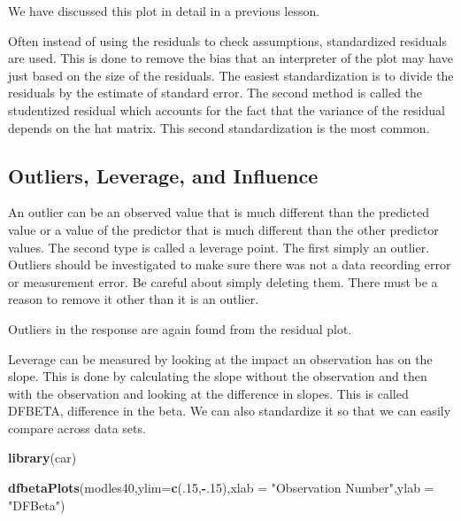 \documentclass[]{book}
\newenvironment{Shaded}{\begin{snugshade}}{\end{snugshade}}
\newcommand{\KeywordTok}[1]{\textcolor[rgb]{0.13,0.29,0.53}{\textbf{#1}}}
\newcommand{\DataTypeTok}[1]{\textcolor[rgb]{0.13,0.29,0.53}{#1}}
\newcommand{\DecValTok}[1]{\textcolor[rgb]{0.00,0.00,0.81}{#1}}
\newcommand{\StringTok}[1]{\textcolor[rgb]{0.31,0.60,0.02}{#1}}
\newcommand{\OperatorTok}[1]{\textcolor[rgb]{0.81,0.36,0.00}{\textbf{#1}}}
\newcommand{\NormalTok}[1]{#1}
\theoremstyle{definition}
\theoremstyle{definition}
\theoremstyle{definition}
\theoremstyle{remark}
\begin{document}
We have discussed this plot in detail in a previous lesson.

Often instead of using the residuals to check assumptions, standardized
residuals are used. This is done to remove the bias that an interpreter
of the plot may have just based on the size of the residuals. The
easiest standardization is to divide the residuals by the estimate of
standard error. The second method is called the studentized residual
which accounts for the fact that the variance of the residual depends on
the hat matrix. This second standardization is the most common.

\subsection{Outliers, Leverage, and
Influence}\label{outliers-leverage-and-influence}

An outlier can be an observed value that is much different than the
predicted value or a value of the predictor that is much different than
the other predictor values. The second type is called a leverage point.
The first simply an outlier. Outliers should be investigated to make
sure there was not a data recording error or measurement error. Be
careful about simply deleting them. There must be a reason to remove it
other than it is an outlier.

Outliers in the response are again found from the residual plot.

Leverage can be measured by looking at the impact an observation has on
the slope. This is done by calculating the slope without the observation
and then with the observation and looking at the difference in slopes.
This is called DFBETA, difference in the beta. We can also standardize
it so that we can easily compare across data sets.

\begin{Shaded}
\begin{Highlighting}[]
\KeywordTok{library}\NormalTok{(car)}
\end{Highlighting}
\end{Shaded}

\begin{Shaded}
\begin{Highlighting}[]
\KeywordTok{dfbetaPlots}\NormalTok{(modles40,}\DataTypeTok{ylim=}\KeywordTok{c}\NormalTok{(.}\DecValTok{15}\NormalTok{,}\OperatorTok{-}\NormalTok{.}\DecValTok{15}\NormalTok{),}\DataTypeTok{xlab =} \StringTok{"Observation Number"}\NormalTok{,}\DataTypeTok{ylab =} \StringTok{"DFBeta"}\NormalTok{)}
\end{Highlighting}
\end{Shaded}
\end{document}
